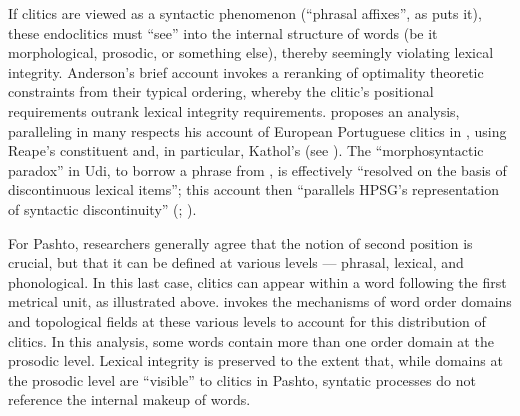 \documentclass[output=paper
                ,modfonts
                ,nonflat
	        ,collection
	        ,collectionchapter
	        ,collectiontoclongg
 	        ,biblatex
                ,babelshorthands
                ,newtxmath
                ,draftmode
                ,colorlinks, citecolor=brown
]{./langsci/langscibook}
\begin{document}
{If clitics are viewed as a syntactic phenomenon (``phrasal affixes'', as \citealt{Anderson2005} puts it), these endoclitics must ``see'' into the internal structure of words (be it morphological, prosodic, or something else), thereby seemingly violating  lexical integrity. Anderson's brief account invokes a reranking of optimality theoretic constraints from their typical ordering, whereby the clitic's positional requirements outrank lexical integrity requirements. \citet{Crysmann2000b} proposes an analysis, paralleling in many respects his account of European Portuguese clitics in \citet{Crysmann2000a}, using Reape's constituent  \citep{Reape1994} and, in particular, Kathol's  \citep{Kathol1999} (see ). The ``morphosyntactic paradox'' in Udi, to borrow a phrase from \citet{Crysmann2002}, is effectively ``resolved on the basis of discontinuous lexical items''; this account then ``parallels HPSG's representation of syntactic discontinuity'' (\citealt{Crysmann2000b}; ).

For Pashto, researchers generally agree that the notion of second position is crucial, but that it
can be defined at various levels --- phrasal, lexical, and phonological. In this last case, clitics
can appear within a word following the first metrical unit, as illustrated above.
\citet{Dost2007} invokes the mechanisms of word order domains \citep{Reape1994} and topological fields \citep{Kathol1999} at these various levels to account for this distribution of clitics. In this analysis, some words contain more than one order domain at the prosodic level. Lexical integrity is preserved to the extent that, while domains at the prosodic level are ``visible'' to clitics in Pashto, syntatic processes do not reference the internal makeup of words.

}
\end{document}
